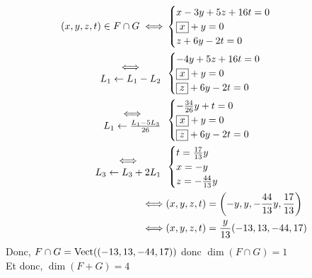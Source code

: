 \begin{itemize}
		\begin{align*}
			(x,y,z,t) \in F \cap G \iff& \begin{cases}
				x - 3y + 5z + 16t = 0\\
				\boxed x + y = 0\\
				z + 6y - 2t = 0
			\end{cases}\\
			\begin{array}{c}
				\iff\\
				L_1\leftarrow L_1 - L_2
			\end{array}&\begin{cases}
				-4y + 5z + 16t = 0\\
				\boxed x + y = 0\\
				\boxed z + 6y -2t = 0
			\end{cases}\\
			\begin{array}{c}
				\iff\\
				L_1 \leftarrow \frac{L_1 - 5 L_3}{26}
			\end{array}&\begin{cases}
				-\frac{34}{26}y + t = 0\\
				\boxed x + y = 0\\
				\boxed z + 6y - 2t = 0
			\end{cases}\\
			\begin{array}{c}
				\iff\\
				L_3\leftarrow L_3 + 2L_1
			\end{array}&\begin{cases}
				t = \frac{17}{13}y\\
				x = -y\\
				z = -\frac{44}{13}y
			\end{cases}\\
				\iff& (x,y,z,t) = \left(-y,y, -\frac{44}{13}y, \frac{17}{13}\right)\\
				\iff& (x,y,z,t) = \frac{y}{13}(-13, 13, -44, 17)
		\end{align*}
		Donc, $F \cap G = \operatorname{Vect}((-13, 13, -44, 17))$ donc $\dim(F \cap G) = 1$\\
		Et donc, $\dim(F + G) = 4$
\end{itemize}
